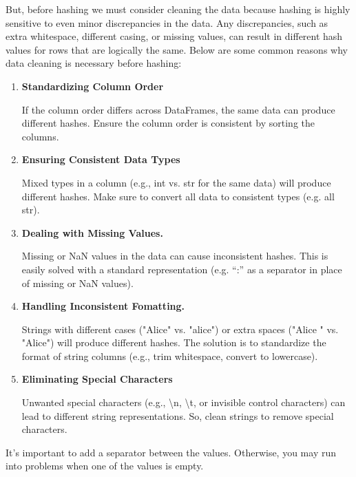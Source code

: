 But, before hashing we must consider cleaning the data because
hashing is highly sensitive to even minor discrepancies in the data.
Any discrepancies, such as extra whitespace, different casing, or
missing values, can result in different hash values for rows that are
logically the same. Below are some common reasons why data cleaning is
necessary before hashing:
\begin{enumerate}
    \item \textbf{Standardizing Column Order}

    \noindent
    If the column order differs across DataFrames, the same data can
    produce different hashes.  Ensure the column order is consistent 
    by sorting the columns.


    \item \textbf{Ensuring Consistent Data Types}

    \noindent
    Mixed types in a column (e.g., int vs. str for the same data)
    will produce different hashes. Make sure to convert all data to
    consistent types (e.g. all str).


    \item \textbf{Dealing with Missing Values.}

    \noindent
    Missing or NaN values in the data can cause inconsistent hashes.
    This is easily solved with a standard representation 
    (e.g. “:” as a separator in place of missing or NaN values).


    \item \textbf{Handling Inconsistent Fomatting.}
    
    \noindent
    Strings with different cases ("Alice" vs. "alice") or extra spaces
    ("Alice " vs. "Alice") will produce different hashes. The solution
    is to standardize the format of string columns
    (e.g., trim whitespace, convert to lowercase).


    \item \textbf{Eliminating Special Characters}

    \noindent
    Unwanted special characters (e.g.,
    \textbackslash n, \textbackslash t, or invisible control characters)
    can lead to different string representations. So, clean strings to
    remove special characters.
\end{enumerate}











It's important to add a separator between the values. Otherwise, you
may run into problems when one of the values is empty.


